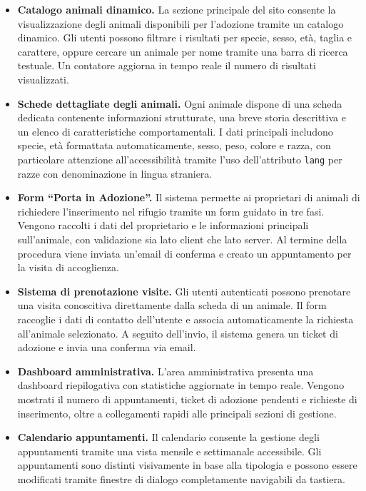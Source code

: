 \documentclass[a4paper,10pt]{article}
\begin{document}
    \begin{itemize}
    \item \textbf{Catalogo animali dinamico.}  
    La sezione principale del sito consente la visualizzazione degli animali disponibili per l’adozione tramite un catalogo dinamico. Gli utenti possono filtrare i risultati per specie, sesso, età, taglia e carattere, oppure cercare un animale per nome tramite una barra di ricerca testuale. Un contatore aggiorna in tempo reale il numero di risultati visualizzati.

    \item \textbf{Schede dettagliate degli animali.}  
    Ogni animale dispone di una scheda dedicata contenente informazioni strutturate, una breve storia descrittiva e un elenco di caratteristiche comportamentali. I dati principali includono specie, età formattata automaticamente, sesso, peso, colore e razza, con particolare attenzione all’accessibilità tramite l’uso dell’attributo \texttt{lang} per razze con denominazione in lingua straniera.

    \item \textbf{Form ``Porta in Adozione''.}  
    Il sistema permette ai proprietari di animali di richiedere l’inserimento nel rifugio tramite un form guidato in tre fasi. Vengono raccolti i dati del proprietario e le informazioni principali sull’animale, con validazione sia lato client che lato server. Al termine della procedura viene inviata un’email di conferma e creato un appuntamento per la visita di accoglienza.

    \item \textbf{Sistema di prenotazione visite.}  
    Gli utenti autenticati possono prenotare una visita conoscitiva direttamente dalla scheda di un animale. Il form raccoglie i dati di contatto dell’utente e associa automaticamente la richiesta all’animale selezionato. A seguito dell’invio, il sistema genera un ticket di adozione e invia una conferma via email.

    \item \textbf{Dashboard amministrativa.}  
    L’area amministrativa presenta una dashboard riepilogativa con statistiche aggiornate in tempo reale. Vengono mostrati il numero di appuntamenti, ticket di adozione pendenti e richieste di inserimento, oltre a collegamenti rapidi alle principali sezioni di gestione.

    \item \textbf{Calendario appuntamenti.}  
    Il calendario consente la gestione degli appuntamenti tramite una vista mensile e settimanale accessibile. Gli appuntamenti sono distinti visivamente in base alla tipologia e possono essere modificati tramite finestre di dialogo completamente navigabili da tastiera.


\end{itemize}
\end{document}
